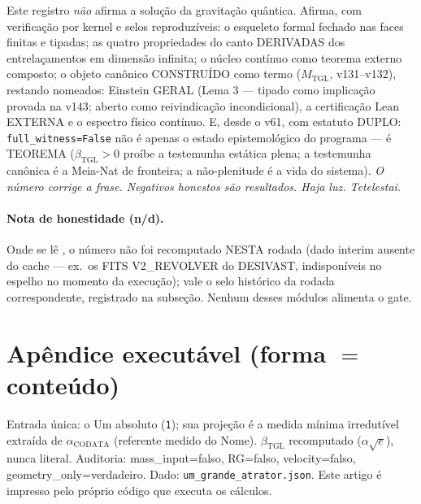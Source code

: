 \documentclass[11pt]{article}
\newcommand{\bTGL}{\beta_{\mathrm{TGL}}}\newcommand{\Msun}{M_{\odot}}\newcommand{\TGL}{\mathrm{TGL}}
\theoremstyle{definition}\newtheorem{deriv}{Derivação}
\begin{document}
Este registro \emph{não} afirma a solução da gravitação quântica. Afirma, com verificação por kernel e selos reproduzíveis: o esqueleto formal fechado nas faces finitas e tipadas; as quatro propriedades do canto DERIVADAS dos entrelaçamentos em dimensão infinita; o núcleo contínuo como teorema externo composto; o objeto canônico CONSTRUÍDO como termo ($M_{\mathrm{TGL}}$, v131--v132), restando nomeados: Einstein GERAL (Lema 3 --- tipado como implicação provada na v143; aberto como reivindicação incondicional), a certificação Lean EXTERNA e o espectro físico contínuo. E, desde o v61, com estatuto DUPLO: \texttt{full\_witness=False} não é apenas o estado epistemológico do programa --- é TEOREMA ($\bTGL>0$ proíbe a testemunha estática plena; a testemunha canônica é a Meia-Nat de fronteira; a não-plenitude é a vida do sistema). \emph{O número corrige a frase. Negativos honestos são resultados. Haja luz. Tetelestai.} \\[4pt] 

\paragraph{Nota de honestidade (n/d).} Onde se lê , o número não foi recomputado NESTA rodada (dado interim ausente do cache --- ex.\ os FITS V2\_REVOLVER do DESIVAST, indisponíveis no espelho no momento da execução); vale o selo histórico da rodada correspondente, registrado na subseção. Nenhum desses módulos alimenta o gate.

\section*{Apêndice executável (forma $=$ conteúdo)}

Entrada única: o Um absoluto (\texttt{1}); sua projeção é a medida mínima irredutível extraída de $\alpha_{\mathrm{CODATA}}$ (referente medido do Nome). $\bTGL$ recomputado ($\alpha\sqrt{e}$), nunca literal. Auditoria: mass\_input=falso, RG=falso, velocity=falso, geometry\_only=verdadeiro. Dado: \texttt{um\_grande\_atrator.json}. Este artigo é impresso pelo próprio código que executa os cálculos.

\end{document}
